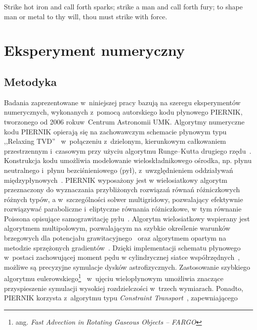 \begin{savequote}[75mm]
Strike hot iron and call forth sparks; strike a man and call forth fury; to
shape man or metal to thy will, thou must strike with force.

\end{savequote}

\chapter{Eksperyment numeryczny}
\section{Metodyka}
\label{sec:metodyka}
Badania zaprezentowane w~niniejszej pracy bazują na szeregu eksperymentów
numerycznych, wykonanych z~pomocą autorskiego kodu płynowego \textsc{PIERNIK},
tworzonego od 2006 roku\linebreak w~Centrum Astronomii UMK.  Algorytmy numeryczne kodu
\textsc{PIERNIK} opierają się na zachowawczym schemacie płynowym typu ,,Relaxing
TVD''~\cite{jin-xin-95} w~połączeniu z~dzielonym, kierunkowym całkowaniem
przestrzennym i~czasowym przy użyciu algorytmu Runge--Kutta drugiego
rzędu~\cite{2003PASP..115..303T,2003ApJS..149..447P}. Konstrukcja kodu umożliwia
modelowanie wieloskładnikowego ośrodka, np. płynu neutralnego i~płynu
bezciśnieniowego (pył), z~uwzględnieniem oddziaływań
międzypłynowych~\cite{piernik1,piernik2}. \textsc{PIERNIK} wyposażony jest w
wielosiatkowy algorytm przeznaczony do wyznaczania przybliżonych rozwiązań
równań różniczkowych różnych typów, a w~szczególności solwer multigridowy,
pozwalający efektywnie rozwiązywać paraboliczne i~eli\-pty\-czne równania
różniczkowe, w~tym równanie Poissona opisujące samograwitację pyłu~\citep{HG00}.
Algorytm wielosiatkowy wspierany jest algorytmem multipolowym, pozwalającym na
szybkie określenie warunków brzegowych dla potencjału grawitacyjnego~\citep{J77}
oraz algorytmem opartym na metodzie sprzężonych gradientów~\cite{pcg}. Dzięki
implementacji schematu płynowego w~postaci zachowującej moment pędu w
cylindrycznej siatce współrzędnych~\cite{M07,SO10}, możliwe są  precyzyjne
symulacje dysków astrofizycznych. Zastosowanie szybkiego algorytmu
eulerowskiego\footnote{ang.  \emph{Fast Advection in Rotating Gaseous Objects
-- FARGO}}~\citep{M00} w~ujęciu wielopłynowym umożliwia znaczące przyspieszenie
symulacji wysokiej rozdzielczości w~trzech wymiarach.  Ponadto, \textsc{PIERNIK}
korzysta z~algorytmu typu \emph{Constraint Transport}~\cite{EH88}, zapewniającego
